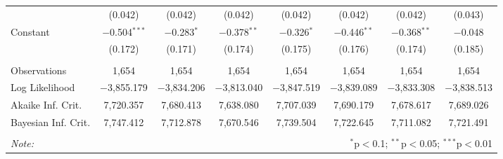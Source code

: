 \begin{sidewaystable}[!htbp]
\begin{tabular}{@{\extracolsep{5pt}}lccccccc}
  & (0.042) & (0.042) & (0.042) & (0.042) & (0.042) & (0.042) & (0.043) \\ 
  Constant & $-$0.504$^{***}$ & $-$0.283$^{*}$ & $-$0.378$^{**}$ & $-$0.326$^{*}$ & $-$0.446$^{**}$ & $-$0.368$^{**}$ & $-$0.048 \\ 
  & (0.172) & (0.171) & (0.174) & (0.175) & (0.176) & (0.174) & (0.185) \\ 
 \hline \\[-1.8ex] 
Observations & 1,654 & 1,654 & 1,654 & 1,654 & 1,654 & 1,654 & 1,654 \\ 
Log Likelihood & $-$3,855.179 & $-$3,834.206 & $-$3,813.040 & $-$3,847.519 & $-$3,839.089 & $-$3,833.308 & $-$3,838.513 \\ 
Akaike Inf. Crit. & 7,720.357 & 7,680.413 & 7,638.080 & 7,707.039 & 7,690.179 & 7,678.617 & 7,689.026 \\ 
Bayesian Inf. Crit. & 7,747.412 & 7,712.878 & 7,670.546 & 7,739.504 & 7,722.645 & 7,711.082 & 7,721.491 \\ 
\hline 
\hline \\[-1.8ex] 
\textit{Note:}  & \multicolumn{7}{r}{$^{*}$p$<$0.1; $^{**}$p$<$0.05; $^{***}$p$<$0.01} \\ 
\end{tabular} 
\end{sidewaystable} 
